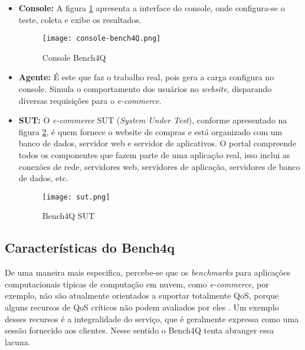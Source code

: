 \begin{itemize}
	
	\item \textbf{Console:} A figura \ref{fig:console-bench4q} apresenta a interface do console, onde configura-se o teste, coleta e exibe os resultados. 
	
	\begin{figure}[!htb]
		\caption{Console Bench4Q}
		\label{fig:console-bench4q}
		\centering
		\texttt{[image: console-bench4Q.png]}
	\end{figure}
	
	\item \textbf{Agente:} É este que faz o trabalho real, pois gera a carga configura no console. Simula o comportamento dos usuários no \textit{website}, disparando diversas requisições para o \textit{e-commerce}. 
	
	\item \textbf{SUT:} O \textit{e-commerce} SUT (\textit{System Under Test}), conforme apresentado na figura \ref{fig:sut},  é quem fornece o website de compras e está organizado com um banco de dados, servidor web e servidor de aplicativos. O portal compreende todos os componentes que fazem parte de uma aplicação real, isso inclui as conexões de rede, servidores web, servidores de aplicação, servidores de banco de dados, etc.
	
	\begin{figure}[htb]
		\caption{Bench4Q SUT}
		\label{fig:sut}
		\centering
		\texttt{[image: sut.png]}
	\end{figure}
	
\end{itemize}


\subsection{Características do Bench4q}
\label{cap:caracteristicas-bench4q}


De uma maneira mais especifica, percebe-se que os \textit{benchmarks} para aplicações computacionais típicas de computação em nuvem, como \textit{e-commerce}, por exemplo, não são atualmente orientados a suportar totalmente QoS, porque alguns recursos de QoS críticos não podem avaliados por eles \cite{Zhang2011}. Um exemplo desses recursos é a integralidade do serviço, que é geralmente expressa como uma sessão fornecido aos clientes. Nesse sentido o Bench4Q tenta abranger essa lacuna.


